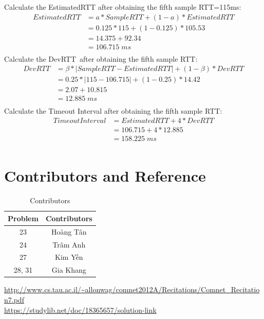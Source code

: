 \documentclass[12pt,a4paper]{article}
\begin{document}
Calculate the EstimatedRTT after obtaining the fifth sample RTT=115ms:
\begin{equation*}
    \begin{split}
        EstimatedRTT &= a * SampleRTT+(1- a) * EstimatedRTT \\
                     &= 0.125 * 115 + (1-0.125) * 105.53 \\
                     &= 14.375 + 92.34\\
                     &= 106.715 \; ms \\
    \end{split}
\end{equation*}
Calculate the DevRTT after obtaining the fifth sample RTT:
\begin{equation*}
    \begin{split}
        DevRTT &= \beta * | SampleRTT- EstimatedRTT|+(1- \beta )* DevRTT \\
                     &= 0.25 * |115-106.715| + (1-0.25) *14.42 \\
                     &= 2.07 + 10.815 \\
                     &= 12.885 \; ms \\
    \end{split}
\end{equation*}
Calculate the Timeout Interval after obtaining the fifth sample RTT:
\begin{equation*}
    \begin{split}
        TimeoutInterval &= EstimatedRTT +4* DevRTT \\
                     &= 106.715 + 4 *12.885\\
                     &= 158.225 \; ms\\
    \end{split}
\end{equation*}


\section*{Contributors and Reference}
\begin{table}[H]
    \caption{Contributors}
    \centering
    \begin{tabular}{c|c}
    \toprule
     \bf{Problem }  & \textbf{Contributors} \\
     \midrule
     23 & Hoàng Tân \\
     24 & Trâm Anh \\
     27 & Kim Yến \\
     28, 31 & Gia Khang \\
     \bottomrule
    \end{tabular}
\end{table}

\url{http://www.cs.tau.ac.il/~allonwag/comnet2012A/Recitations/Comnet_Recitation7.pdf} \\
\url{https://studylib.net/doc/18365657/solution-link} \\
\end{document}
